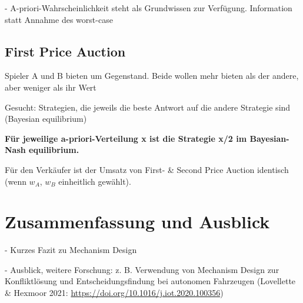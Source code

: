 \documentclass[a4paper,11pt]{article}
\theoremstyle{definition}
\theoremstyle{plain}
\theoremstyle{definition}
\begin{document}
-  A-priori-Wahrscheinlichkeit steht als Grundwissen zur Verfügung. Information statt Annahme des worst-case 

\subsection{First Price Auction}

Spieler A und B bieten um Gegenstand. Beide wollen mehr bieten als der andere, aber weniger als ihr Wert

Gesucht: Strategien, die jeweils die beste Antwort auf die andere Strategie sind (Bayesian equilibrium)

\textbf{Für jeweilige a-priori-Verteilung x ist die Strategie x/2 im Bayesian-Nash equilibrium.}

Für den Verkäufer ist der Umsatz von First- \& Second Price Auction identisch (wenn $w_A$, $w_B$ einheitlich gewählt).


\section{Zusammenfassung und Ausblick}

- Kurzes Fazit zu Mechanism Design

- Ausblick, weitere Forschung: z. B. Verwendung von Mechanism Design zur Konfliktlösung und Entscheidungsfindung bei autonomen Fahrzeugen (Lovellette \& Hexmoor 2021: \url{https://doi.org/10.1016/j.iot.2020.100356}) 
\end{document}
